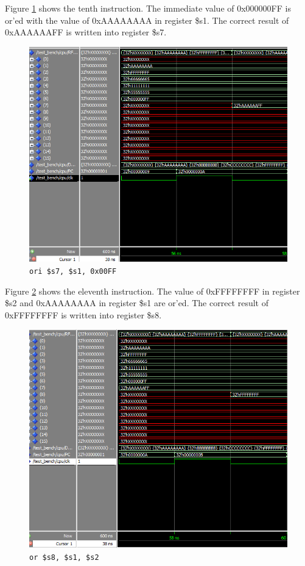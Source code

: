 \documentclass[12pt]{article}
\begin{document}
Figure \ref{fig:10-instr} shows the tenth instruction. The immediate value of 0x000000FF is or'ed with the value of 0xAAAAAAAA in register \$s1. The correct result of 0xAAAAAAFF is written into register \$s7.
\begin{figure}[H]
\centering
\includegraphics[width=\linewidth]{simulation/10-instr}
\caption{\texttt{ori \$s7, \$s1, 0x00FF}}
\label{fig:10-instr}
\end{figure}


Figure \ref{fig:11-instr} shows the eleventh instruction. The value of 0xFFFFFFFF in register \$s2 and 0xAAAAAAAA in register \$s1 are or'ed. The correct result of 0xFFFFFFFF is written into register \$s8.
\begin{figure}[H]
\centering
\includegraphics[width=\linewidth]{simulation/11-instr}
\caption{\texttt{or \$s8, \$s1, \$s2}}
\label{fig:11-instr}
\end{figure}
\end{document}
